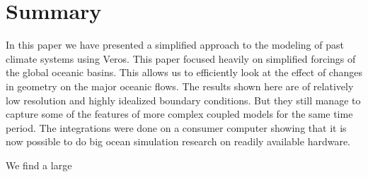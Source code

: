 \section{Summary}
In this paper we have presented a simplified approach to the modeling of past climate systems using Veros. This paper focused heavily on simplified forcings of the global oceanic basins. This allows us  to efficiently look at the effect of changes in geometry on the major oceanic flows. The results shown here are of relatively low resolution and highly idealized boundary conditions. But they still manage to capture some of the features of more complex coupled models for the same time period. The integrations were done on a consumer computer showing that it is now possible to do big ocean simulation research on readily available hardware.

We find a large 


